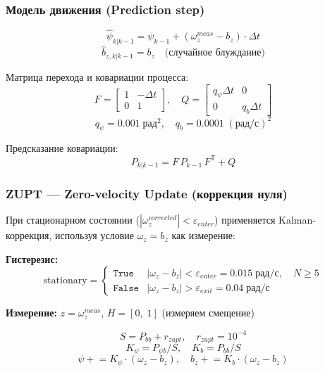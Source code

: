 \documentclass[12pt, a4paper]{article}
\newcommand{\T}{\mathsf{T}}       %
\begin{document}
\subsubsection{Модель движения (Prediction step)}
\begin{equation}
  \hat{\psi}_{k|k-1} = \psi_{k-1} + (\omega_z^{meas} - b_z)\cdot\Delta t
\end{equation}
\begin{equation}
  \hat{b}_{z,k|k-1} = b_z \quad \text{(случайное блуждание)}
\end{equation}

Матрица перехода и ковариации процесса:
\begin{equation}
  F = \begin{bmatrix} 1 & -\Delta t \\ 0 & 1 \end{bmatrix}, \quad
  Q = \begin{bmatrix} q_\psi \Delta t & 0 \\ 0 & q_b \Delta t \end{bmatrix}
\end{equation}
\begin{equation}
  q_\psi = 0.001\;\text{рад}^2,\quad q_b = 0.0001\;(\text{рад/с})^2
\end{equation}

Предсказание ковариации:
\begin{equation}
  P_{k|k-1} = F\, P_{k-1}\, F^\T + Q
\end{equation}

\subsubsection{ZUPT — Zero-velocity Update (коррекция нуля)}
При стационарном состоянии ($|\omega_z^{corrected}| < \varepsilon_{enter}$) применяется Kalman-коррекция, используя условие $\omega_z = b_z$ как измерение:

\begin{mathbox}
\textbf{Гистерезис:}
\[
  \text{stationary} =
  \begin{cases}
    \texttt{True}  & |\omega_z - b_z| < \varepsilon_{enter} = 0.015\;\text{рад/с},\quad N \geq 5 \\
    \texttt{False} & |\omega_z - b_z| > \varepsilon_{exit} = 0.04\;\text{рад/с}
  \end{cases}
\]

\textbf{Измерение:} $z = \omega_z^{meas}$, $H = [0,\; 1]$ (измеряем смещение)

\[
  S = P_{bb} + r_{zupt}, \quad r_{zupt} = 10^{-4}
\]
\[
  K_\psi = P_{\psi b}/S, \quad K_b = P_{bb}/S
\]
\[
  \psi \mathrel{+}= K_\psi \cdot (\omega_z - b_z), \quad
  b_z \mathrel{+}= K_b \cdot (\omega_z - b_z)
\]
\end{mathbox}
\end{document}
